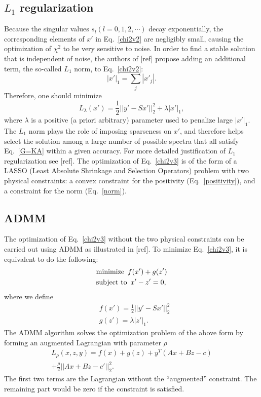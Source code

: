 \documentclass[final,5p,twocolumn,12pt]{elsarticle}
\begin{document}
\subsection{$L_1$ regularization}
Because the singular values $s_l(l=0,1,2,\cdots)$ decay exponentially, the corresponding elements of $x'$ in Eq.~\ref{chi2v2} are negligibly small, causing the optimization of $\chi^2$ to be very sensitive to noise. In order to find a stable solution that is independent of noise, the authors of [ref] propose adding an additional term, the so-called $L_1$ norm, to Eq.~\ref{chi2v2}: 
\begin{equation}
|x'|_1=\sum_j |x'_j|.
\end{equation} 
Therefore, one should minimize 
\begin{equation}
L_\lambda(x')=\frac{1}{2}\lvert\lvert y'-Sx'\rvert\rvert^{2}_{2} + \lambda|x'|_1,
\label{chi2v3}
\end{equation}
where $\lambda$ is a positive (a priori arbitrary) parameter used to penalize large $|x'|_1$. The $L_1$ norm plays the role of imposing sparseness on $x'$, and therefore helps select the solution among a large number of possible spectra that all satisfy Eq.~\ref{G=KA} within a given accuracy. For more detailed justification of $L_1$ regularization see [ref]. The optimization of Eq.~\ref{chi2v3} is of the form of a LASSO (Least Absolute Shrinkage and Selection Operators) problem with two physical constraints: a convex constraint for the positivity (Eq.~\ref{positivity}), and a constraint for the norm (Eq.~\ref{norm}). 

\subsection{ADMM}
The optimization of Eq.~\ref{chi2v3} without the two physical constraints can be carried out using ADMM as illustrated in [ref]. To minimize Eq.~\ref{chi2v3}, it is equivalent to do the following: 
\begin{align}
&\text{minimize } \thinspace f(x')+g(z') \\
&\text{subject to } \thinspace x'-z'=0, 
\end{align}
where we define 
\begin{align}
&f(x')=\frac{1}{2}\lvert\lvert y'-Sx'\rvert\rvert^{2}_{2} \\
&g(z')=\lambda|z'|_1. 
\end{align}
The ADMM algorithm solves the optimization problem of the above form by forming an augmented Lagrangian with parameter $\rho$
\begin{equation}
\begin{aligned}
L_\rho(x,z,y)=f(x)+g(z)+y^T(Ax+Bz-c) \\
+ \frac{\rho}{2}\lvert\lvert Ax+Bz-c'\rvert\rvert^{2}_{2}.
\end{aligned}
\end{equation}
The first two terms are the Lagrangian without the ``augmented'' constraint. The remaining part would be zero if the constraint is satisfied. 
\end{document}
